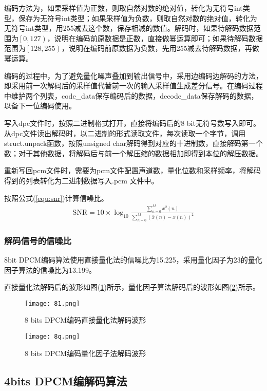 \documentclass{hitreport}
\begin{document}
编码方法为，如果采样值为正数，则取自然对数的绝对值，转化为无符号int类型，保存为无符号int类型；如果采样值为负数，则取自然对数的绝对值，转化为无符号int类型，用255减去这个数，保存相减的数值。解码时，如果待解码数据范围为$\left[0,127\right)$，说明在编码前原数据是正数，直接做幂运算即可；如果待解码数据范围为$\left[128, 255\right)$，说明在编码前原数据为负数，先用255减去待解码数据，再做幂运算。

编码的过程中，为了避免量化噪声叠加到输出信号中，采用边编码边解码的方法，即采用前一次解码后的采样值代替前一次的输入采样值生成差分信号。在编码过程中维护两个列表，code\_data保存编码后的数据，decode\_data保存解码的数据，以备下一位编码使用。

写入dpc文件时，按照二进制格式打开，直接将编码后的8 bit无符号数写入即可。从dpc文件读出解码时，以二进制的形式读取文件，每次读取一个字节，调用struct.unpack函数，按照unsigned char解码得到对应的十进制数，直接解码第一个数；对于其他数据，将解码后与前一个解压缩的数据相加即得到本位的解压数据。

重新写回pcm文件时，需要为pcm文件配置声道数，量化位数和采样频率，将解码得到的列表转化为二进制数据写入.pcm 文件中。

按照公式(\ref{equ:snr})计算信噪比。
\begin{align}\label{equ:snr}
\text{SNR} = 10\times \log_{10}\frac{\sum_{n=0}^{M}x^2\left(n\right)}{\sum_{n=0}^{M}\left(\bar{x}\left(n\right) - x\left(n\right)\right)^2}
\end{align}

\subsubsection{解码信号的信噪比}

8bit DPCM编码算法使用直接量化法的信噪比为15.225，采用量化因子为23的量化因子算法的信噪比为13.199。

直接量化法解码后的波形如图(\ref{fig:81})所示，量化因子算法解码后的波形如图(\ref{fig:8q})所示。

\begin{figure}[htb]
	\centering
	\texttt{[image: 81.png]}
	\caption{8 bits DPCM编码直接量化法解码波形}\label{fig:81}
\end{figure}

\begin{figure}[htb]
	\centering
	\texttt{[image: 8q.png]}
	\caption{8 bits DPCM编码量化因子法解码波形}\label{fig:8q}
\end{figure}


\subsection{ 4bits DPCM编解码算法}\label{sec:sec2}
\end{document}
